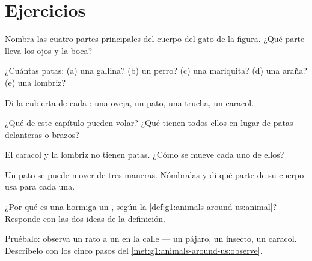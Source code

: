 \section{Ejercicios}

\begin{exercise}[$\star$]\label{exo:g1:animals-around-us:1}
Nombra las cuatro partes principales del cuerpo del gato de la
figura. ¿Qué parte lleva los ojos y la boca?
\end{exercise}

\begin{exercise}[$\star$]\label{exo:g1:animals-around-us:2}
¿Cuántas patas: (a) una gallina? (b) un perro? (c) una mariquita?
(d) una araña? (e) una lombriz?
\end{exercise}

\begin{exercise}[$\star$]\label{exo:g1:animals-around-us:3}
Di la cubierta de cada : una oveja, un pato, una trucha, un
caracol.
\end{exercise}

\begin{exercise}[$\star$]\label{exo:g1:animals-around-us:4}
¿Qué  de este capítulo pueden volar? ¿Qué tienen todos ellos
en lugar de patas delanteras o brazos?
\end{exercise}

\begin{exercise}[$\star$]\label{exo:g1:animals-around-us:5}
El caracol y la lombriz no tienen patas. ¿Cómo se mueve cada uno de
ellos?
\end{exercise}

\begin{exercise}[$\star$]\label{exo:g1:animals-around-us:6}
Un pato se puede mover de tres maneras. Nómbralas y di qué parte de
su cuerpo usa para cada una.
\end{exercise}

\begin{exercise}[$\star$]\label{exo:g1:animals-around-us:7}
¿Por qué es una hormiga un , según la
\cref{def:g1:animals-around-us:animal}? Responde con las dos ideas de
la definición.
\end{exercise}

\begin{exercise}[$\star$]\label{exo:g1:animals-around-us:8}
Pruébalo: observa un rato a un  en la calle --- un pájaro, un
insecto, un caracol. Descríbelo con los cinco pasos del
\cref{met:g1:animals-around-us:observe}.
\end{exercise}

